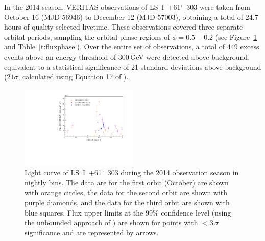 \documentclass[preprint2]{aastex}
\newcommand{\lsi}{LS~I~+61$^{\circ}$~303}
\newcommand{\gev}{\,GeV}
\begin{document}
In the 2014 season, VERITAS observations of \lsi{} were taken from October 16 (MJD 56946) to  December 12 (MJD 57003), obtaining a total of 24.7 hours of quality selected livetime. These observations covered three separate orbital periods, sampling the orbital phase regions of $\phi = 0.5-0.2$ (see Figure~\ref{f:fluxphase} and Table~\ref{t:fluxphase}). Over the entire set of observations, a total of 449 excess events above an energy threshold of 300\gev{} were detected above background, equivalent to a statistical significance of 21 standard deviations above background ($21\sigma$, calculated using Equation 17 of \citet{LiMa}).

\begin{figure}[ht]
\centering
\includegraphics[width=0.5\textwidth]{./figs/fluxvphase_300.pdf}
\caption{Light curve of \lsi{} during the 2014 observation season in nightly bins. %
The data are for the first orbit (October) are shown with orange circles, the data for the second orbit are shown with purple diamonds, and the data for the third orbit are shown with blue squares. Flux upper limits at the 99\% confidence level (using the unbounded approach of \citet{Rolke}) are shown for points with $<3\,\sigma$ significance and are represented by arrows.
}
\label{f:fluxphase}
\end{figure}
\end{document}
